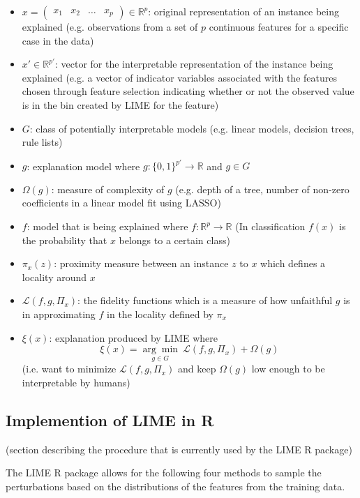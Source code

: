 \documentclass[AMS,STIX2COL]{WileyNJD-v2}\usepackage[]{graphicx}\usepackage[]{color}
\begin{document}
\begin{itemize}
\item $x=\left(\begin{array}{cccc}x_1 & x_2 & \hdots & x_p\end{array}\right)\in\mathbb{R}^p$: original representation of an instance being explained (e.g. observations from a set of $p$ continuous features for a specific case in the data) %
\item $x'\in\mathbb{R}^{p'}$: vector for the interpretable representation of the instance being explained (e.g. a vector of indicator variables associated with the features chosen through feature selection indicating whether or not the observed value is in the bin created by LIME for the feature)
\item $G$: class of potentially interpretable models (e.g. linear models, decision trees, rule lists)
\item $g$: explanation model where $g:\{0,1\}^{p'}\rightarrow\mathbb{R}$ and $g\in G$
\item $\Omega(g)$: measure of complexity of $g$ (e.g. depth of a tree, number of non-zero coefficients in a linear model fit using LASSO)
\item $f$: model that is being explained where $f:\mathbb{R}^p\rightarrow\mathbb{R}$ (In classification $f(x)$ is the probability that $x$ belongs to a certain class)
\item $\pi_x(z)$: proximity measure between an instance $z$ to $x$ which defines a locality around $x$
\item $\mathcal{L}(f, g, \Pi_x)$: the fidelity functions which is a measure of how unfaithful $g$ is in approximating $f$ in the locality defined by $\pi_x$
\item $\xi(x)$: explanation produced by LIME where
  $$\xi(x)=\underset{g\in G}{\arg\min} \ \mathcal{L}(f, g, \Pi_x)+\Omega(g)$$
(i.e. want to minimize $\mathcal{L}(f, g, \Pi_x)$ and keep $\Omega(g)$ low enough to be interpretable by humans)
\end{itemize}

\subsection{Implemention of LIME in R}

(section describing the procedure that is currently used by the LIME R package)

The LIME R package allows for the following four methods to sample the perturbations based on the distributions of the features from the training data.
\end{document}
